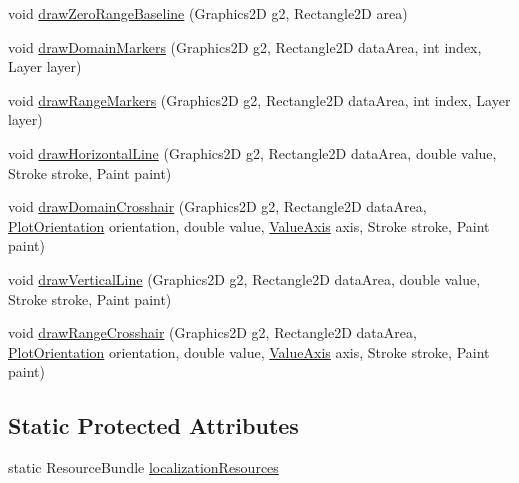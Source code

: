 \begin{DoxyCompactItemize}
\item 
void \mbox{\hyperlink{classorg_1_1jfree_1_1chart_1_1plot_1_1_x_y_plot_a2b728d76cd5efb93b68bb1ae878b23c9}{draw\+Zero\+Range\+Baseline}} (Graphics2D g2, Rectangle2D area)
\item 
void \mbox{\hyperlink{classorg_1_1jfree_1_1chart_1_1plot_1_1_x_y_plot_a8f40b71f2f5375e05562fac296073857}{draw\+Domain\+Markers}} (Graphics2D g2, Rectangle2D data\+Area, int index, Layer layer)
\item 
void \mbox{\hyperlink{classorg_1_1jfree_1_1chart_1_1plot_1_1_x_y_plot_a1106a9d510e3383a0cd5c73482b250c7}{draw\+Range\+Markers}} (Graphics2D g2, Rectangle2D data\+Area, int index, Layer layer)
\item 
void \mbox{\hyperlink{classorg_1_1jfree_1_1chart_1_1plot_1_1_x_y_plot_a1fdc6f7f1889c3fd82e656c64db8c733}{draw\+Horizontal\+Line}} (Graphics2D g2, Rectangle2D data\+Area, double value, Stroke stroke, Paint paint)
\item 
void \mbox{\hyperlink{classorg_1_1jfree_1_1chart_1_1plot_1_1_x_y_plot_a307fe743a7d29edbe05b11d03d26b32d}{draw\+Domain\+Crosshair}} (Graphics2D g2, Rectangle2D data\+Area, \mbox{\hyperlink{classorg_1_1jfree_1_1chart_1_1plot_1_1_plot_orientation}{Plot\+Orientation}} orientation, double value, \mbox{\hyperlink{classorg_1_1jfree_1_1chart_1_1axis_1_1_value_axis}{Value\+Axis}} axis, Stroke stroke, Paint paint)
\item 
void \mbox{\hyperlink{classorg_1_1jfree_1_1chart_1_1plot_1_1_x_y_plot_a5418102db878c326b1fd3a7de42465f1}{draw\+Vertical\+Line}} (Graphics2D g2, Rectangle2D data\+Area, double value, Stroke stroke, Paint paint)
\item 
void \mbox{\hyperlink{classorg_1_1jfree_1_1chart_1_1plot_1_1_x_y_plot_a2b2c1a3503ad3553a58969179f0ee7e8}{draw\+Range\+Crosshair}} (Graphics2D g2, Rectangle2D data\+Area, \mbox{\hyperlink{classorg_1_1jfree_1_1chart_1_1plot_1_1_plot_orientation}{Plot\+Orientation}} orientation, double value, \mbox{\hyperlink{classorg_1_1jfree_1_1chart_1_1axis_1_1_value_axis}{Value\+Axis}} axis, Stroke stroke, Paint paint)
\end{DoxyCompactItemize}
\subsection*{Static Protected Attributes}
\begin{DoxyCompactItemize}
\item 
static Resource\+Bundle \mbox{\hyperlink{classorg_1_1jfree_1_1chart_1_1plot_1_1_x_y_plot_a2b65acb9812f6564dcc691081b97f475}{localization\+Resources}}
\end{DoxyCompactItemize}
